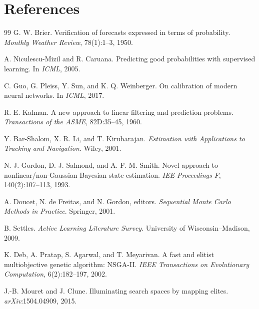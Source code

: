 \documentclass[11pt]{article}
\begin{document}
\section{References}
\begin{thebibliography}{99}
G. W. Brier.
\newblock Verification of forecasts expressed in terms of probability.
\newblock \emph{Monthly Weather Review}, 78(1):1--3, 1950.

A. Niculescu-Mizil and R. Caruana.
\newblock Predicting good probabilities with supervised learning.
\newblock In \emph{ICML}, 2005.

C. Guo, G. Pleiss, Y. Sun, and K. Q. Weinberger.
\newblock On calibration of modern neural networks.
\newblock In \emph{ICML}, 2017.

R. E. Kalman.
\newblock A new approach to linear filtering and prediction problems.
\newblock \emph{Transactions of the ASME}, 82D:35--45, 1960.

Y. Bar-Shalom, X. R. Li, and T. Kirubarajan.
\newblock \emph{Estimation with Applications to Tracking and Navigation}.
\newblock Wiley, 2001.

N. J. Gordon, D. J. Salmond, and A. F. M. Smith.
\newblock Novel approach to nonlinear/non-Gaussian Bayesian state estimation.
\newblock \emph{IEE Proceedings F}, 140(2):107--113, 1993.

A. Doucet, N. de Freitas, and N. Gordon, editors.
\newblock \emph{Sequential Monte Carlo Methods in Practice}.
\newblock Springer, 2001.

B. Settles.
\newblock \emph{Active Learning Literature Survey}.
\newblock University of Wisconsin--Madison, 2009.

K. Deb, A. Pratap, S. Agarwal, and T. Meyarivan.
\newblock A fast and elitist multiobjective genetic algorithm: NSGA-II.
\newblock \emph{IEEE Transactions on Evolutionary Computation}, 6(2):182--197, 2002.

J.-B. Mouret and J. Clune.
\newblock Illuminating search spaces by mapping elites.
\newblock \emph{arXiv}:1504.04909, 2015.
\end{thebibliography}
\end{document}
